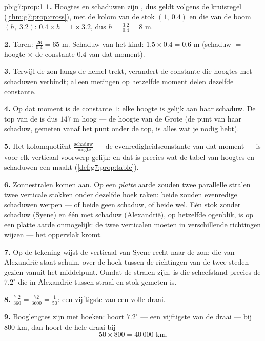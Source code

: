 \begin{solution}{pb:g7:prop:1}
\textbf{1.} Hoogtes en schaduwen zijn , dus geldt volgens de kruisregel
(\cref{thm:g7:prop:cross}), met de kolom van de stok $(1,\ 0.4)$ en die van de
boom $(h,\ 3.2)$: $0.4 \times h = 1 \times 3.2$, dus
$h = \frac{3.2}{0.4} = 8$ m.

\textbf{2.} Toren: $\frac{26}{0.4} = 65$ m. Schaduw van het kind:
$1.5 \times 0.4 = 0.6$ m (schaduw $=$ hoogte $\times$ de constante $0.4$ van dat
moment).

\textbf{3.} Terwijl de zon langs de hemel trekt, verandert de constante die hoogtes
met schaduwen verbindt; alleen metingen op hetzelfde moment delen dezelfde
constante.

\textbf{4.} Op dat moment is de constante $1$: elke hoogte is gelijk aan haar
schaduw. De top van de  is dus $147$ m hoog --- de hoogte van de Grote
 (de punt van haar schaduw, gemeten vanaf het punt onder de top, is alles
wat je nodig hebt).

\textbf{5.} Het kolomquotiënt $\frac{\text{schaduw}}{\text{hoogte}}$ --- de
evenredigheidsconstante van dat moment --- is voor elk verticaal voorwerp gelijk:
en dat is precies wat de tabel van hoogtes en schaduwen een 
maakt (\cref{def:g7:prop:table}).

\textbf{6.} Zonnestralen komen  aan. Op een \emph{platte} aarde zouden twee
parallelle stralen twee verticale stokken onder dezelfde hoek raken: beide zouden
evenredige schaduwen werpen --- of beide geen schaduw, of beide wel. Eén stok
zonder schaduw (Syene) en één met schaduw (Alexandrië), op hetzelfde ogenblik, is
op een platte aarde onmogelijk: de twee verticalen moeten in verschillende
richtingen wijzen --- het oppervlak kromt.

\textbf{7.} Op de tekening wijst de verticaal van Syene recht naar de zon; die van
Alexandrië staat schuin, over de hoek tussen de richtingen van de twee steden
gezien vanuit het middelpunt. Omdat de stralen  zijn, is die scheefstand
precies de $7.2^\circ$ die in Alexandrië tussen straal en stok gemeten is.

\textbf{8.} $\frac{7.2}{360} = \frac{72}{3600} = \frac{1}{50}$: een vijftigste van
een volle draai.

\textbf{9.} Booglengtes zijn  met hoeken: hoort $7.2^\circ$ --- een
vijftigste van de draai --- bij $800$ km, dan hoort de hele draai bij
\[
50 \times 800 = 40\,000 \text{ km}.
\]


\end{solution}
